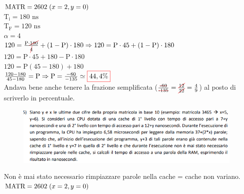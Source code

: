 $ \text{MATR} = 2602 \hspace{0.1cm}(x = 2, y = 0) $ \\

$ \text{T}_\text{i} = 180 \text{ ns} $ \\
$ \text{T}_\text{F} = 120 \text{ ns} $ \\
$ \alpha = 4 $ \\

$ 120 = \frac{\text{P} \cdot \color{red}\cancel{\normalcolor180}}{\color{red}\cancel{\normalcolor4}} + (1 - \text{P}) \cdot 180 \Rightarrow 120 = \text{P} \cdot 45 + (1 - \text{P}) \cdot 180$ \\

$ 120 = \text{P} \cdot 45 + 180 - \text{P} \cdot 180 $ \\

$ 120 = \text{P}(45 - 180) + 180 $ \\

$ \frac{120 - 180}{45 - 180} = \text{P}  \Rightarrow \text{P} = \frac{-60}{-135} \simeq \color{red}\boxed{\normalcolor 44,4\%} $ \\

\textsf{{\small Andava bene anche tenere la frazione semplificata ($ \frac{\text{\color{red}\sout{\normalcolor-60}}}{\text{\color{red}\sout{\normalcolor-135}}} = \frac{\color{red}\cancel{\normalcolor12}}{\color{red}\cancel{\normalcolor22}} = \frac{4}{9}$) al posto di scriverlo in percentuale.}} \\


\begin{figure}[ht]
	\includegraphics[width=1\linewidth]{es5_MiglioramentoPrestazioneMemoria}
	\label{fig:es5MiglioramentoPrestazioneMemoria}
\end{figure}

\textsf{{\small Non è mai stato necessario rimpiazzare parole nella cache = cache non variano.}} \\

$ \text{MATR} = 2602 \hspace{.1cm}(x = 2, y = 0) $ \\

